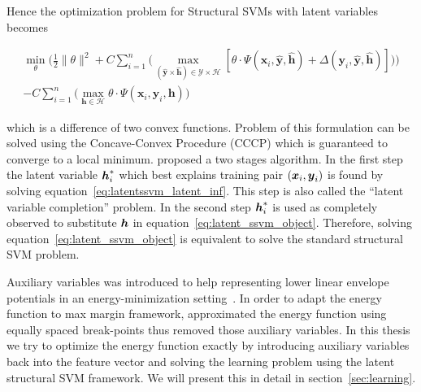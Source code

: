 Hence the optimization problem for Structural SVMs with latent
variables becomes

\begin{align}
\label{eq:latent_ssvm_object}
  \min_\theta\bigg(\frac{1}{2}\|\theta\|^2+
  C\sum_{i=1}^{n}\big(\max_{(\mathbf{\hat{y}} \times
  \mathbf{\hat{h}}) \in \mathcal{Y} \times \mathcal{H}}
  [\theta\cdot\Psi(\mathbf{x}_i,\mathbf{\hat{y}},\mathbf{\hat{h}}) +
  \Delta(\mathbf{y}_i,\mathbf{\hat{y}},\mathbf{\hat{h}})]\big)\bigg)\\
  -C\sum_{i=1}^{n}\big(\max_{\mathbf{h} \in \mathcal{H}} \theta \cdot
  \Psi(\mathbf{x}_i,\mathbf{y}_i,\mathbf{h})\big)\nonumber
\end{align}

\noindent which is a difference of two convex functions. Problem
of this formulation can be solved using the Concave-Convex
Procedure (CCCP)\cite{yuille2002concave} which is guaranteed to
converge to a local minimum.  proposed a
two stages algorithm. In the first step the latent variable
${\boldsymbol{h}}_i^*$ which best explains training pair $({\boldsymbol{x}}_i, {\boldsymbol{y}}_i)$ is
found by solving equation~\eqref{eq:latentssvm_latent_inf}. This
step is also called the ``latent variable completion'' problem.
In the second step ${\boldsymbol{h}}_i^*$ is used as completely observed to
substitute ${\boldsymbol{h}}$ in equation~\eqref{eq:latent_ssvm_object}.
Therefore, solving equation~\eqref{eq:latent_ssvm_object} is
equivalent to solve the standard structural SVM problem.

Auxiliary variables was introduced to help representing lower
linear envelope potentials in an energy-minimization
setting~\cite{Kohli:CVPR10}. In order to adapt the energy
function to max margin framework, 
approximated the energy function using equally spaced
break-points thus removed those auxiliary variables. In this
thesis we try to optimize the energy function exactly by
introducing auxiliary variables back into the feature vector and
solving the learning problem using the latent structural SVM
framework. We will present this in detail in
section~\ref{sec:learning}.




\clearpage
\cleardoublepage




